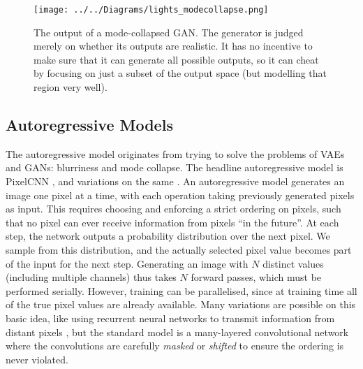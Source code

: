 \documentclass[10pt,a4paper]{article}
\newcommand{\nquote}[1]{``{#1}''}
\begin{document}
\begin{figure}
  \centering
  \texttt{[image: ../../Diagrams/lights\_modecollapse.png]}
  \caption{The output of a mode-collapsed GAN. The generator is judged merely on whether its outputs are realistic. It has no incentive to make sure that it can generate all possible outputs, so it can cheat by focusing on just a subset of the output space (but modelling that region very well).}
  \label{modecollapse}
\end{figure}

\subsection{Autoregressive Models}

The autoregressive model originates from trying to solve the problems of VAEs and GANs: blurriness and mode collapse. The headline autoregressive model is PixelCNN \citep{pixelcnn2}, and variations on the same \citep{pixelcnn3,pixelcnn++,superres,wavenet,bytenet,videopixel}. An autoregressive model generates an image one pixel at a time, with each operation taking previously generated pixels as input. This requires choosing and enforcing a strict ordering on pixels, such that no pixel can ever receive information from pixels \nquote{in the future}. At each step, the network outputs a probability distribution over the next pixel. We sample from this distribution, and the actually selected pixel value becomes part of the input for the next step. Generating an image with $N$ distinct values (including multiple channels) thus takes $N$ forward passes, which must be performed serially. However, training can be parallelised, since at training time all of the true pixel values are already available. Many variations are possible on this basic idea, like using recurrent neural networks to transmit information from distant pixels \citep{pixelcnn1}, but the standard model is a many-layered convolutional network where the convolutions are carefully \emph{masked} \citep{pixelcnn2} or \emph{shifted} \citep{pixelcnn++} to ensure the ordering is never violated.
\end{document}
